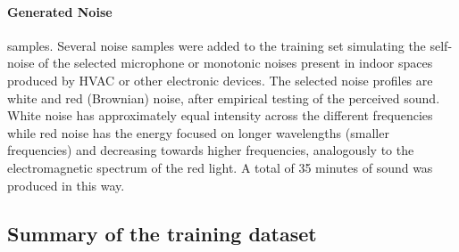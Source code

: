 \paragraph*{Generated Noise} samples. Several noise samples were added to the training set simulating the self-noise of the selected microphone or monotonic noises present in indoor spaces produced by HVAC or other electronic devices. The selected noise profiles are white and red (Brownian) noise, after empirical testing of the perceived sound. White noise has approximately equal intensity across the different frequencies while red noise has the energy focused on longer wavelengths (smaller frequencies) and decreasing towards higher frequencies, analogously to the electromagnetic spectrum of the red light. A total of 35 minutes of sound was produced in this way.


\subsection{Summary of the training dataset}

